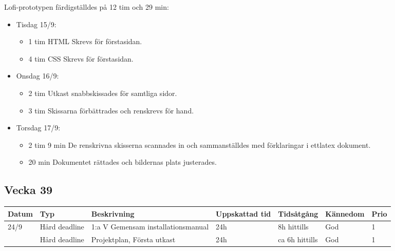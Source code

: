 \documentclass{TDP003mall}
\begin{document}
Lofi-prototypen färdigställdes på 12 tim och 29 min:
\begin{itemize}
	\item Tisdag 15/9:
	\begin{itemize}
		\item 1 tim HTML Skrevs för förstasidan.
		\item 4 tim CSS Skrevs för förstasidan.
	\end{itemize}
	\item Onsdag 16/9:
	\begin{itemize}
		\item 2 tim Utkast snabbskissades för samtliga sidor.
		\item 3 tim Skissarna förbättrades och renskrevs för hand.
	\end{itemize}
	\item Torsdag 17/9:
	\begin{itemize}
		\item 2 tim 9 min De renskrivna skisserna scannades in och sammanställdes med förklaringar i ettlatex dokument.
		\item 20 min Dokumentet rättades och bildernas plats justerades.\\
	\end{itemize}
\end{itemize}

\newpage

\subsection{Vecka 39}
\begin{tabularx}{\linewidth}{|l|l|X|l|l|l|l|}
	\hline
	Datum & Typ           & Beskrivning                        & Uppskattad tid & Tidsåtgång     & Kännedom & Prio \\ [0.5ex]
	\hline                                     
	24/9  & Hård deadline & 1:a V Gemensam installationsmanual & 24h            & 8h hittills    & God      & 1    \\
	\hline                                     
          & Hård deadline & Projektplan, Första utkast         & 24h            & ca 6h hittills & God      & 1    \\
	\hline
\end{tabularx}
\end{document}
